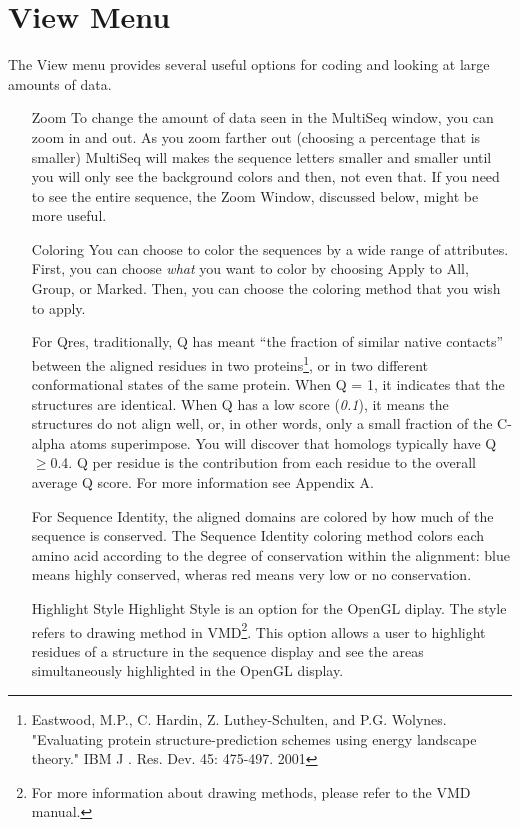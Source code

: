 \label {unit4}


\section{View Menu}

The \textsf{View} menu provides several useful options for coding and
looking at large amounts of data.

\begin{itemize}
\item[Zoom] To change the amount of data seen in the MultiSeq window,
you can zoom in and out.  As you zoom farther out (choosing a percentage
that is smaller) MultiSeq will makes the sequence letters smaller and
smaller until you will only see the background colors and then, not even
that.  If you need to see the entire sequence, the \textsf{Zoom Window},
discussed below, might be more useful.
\item [Coloring]
You can choose to color the sequences by a wide range of attributes.
First, you can choose \emph{what} you want to color by choosing
\textsf{Apply to All}, \textsf{Group}, or \textsf{Marked}.  Then, you
can choose the coloring method that you wish to apply.  

For \textsf{Qres}, traditionally, Q has meant ``the fraction of
     similar native contacts'' between the aligned residues in two
     proteins\footnote {Eastwood, M.P., C. Hardin, Z. Luthey-Schulten,
     and P.G. Wolynes. "Evaluating protein structure-prediction schemes
     using energy landscape theory."  IBM J . Res. Dev. 45: 475-497.
     2001}, or in two different conformational states of the same
     protein.  When Q = 1, it indicates that the structures are
     identical.  When Q has a low score (\textit{0.1}), it means the
     structures do not align well, or, in other words, only a small
     fraction of the C-alpha atoms superimpose.  You will discover that
     homologs typically have Q$\ge$0.4.  Q per residue is the
     contribution from each residue to the overall average Q score.  For
     more information see Appendix A.

For \textsf{Sequence Identity}, the aligned domains are colored by how
much of the sequence is conserved. The \textsf{Sequence Identity}
coloring method colors each amino acid according to the degree of
conservation within the alignment: blue means highly conserved, wheras
red means very low or no conservation.

\item[Highlight Style]
\textsf{Highlight Style} is an option for the OpenGL diplay.  The style
refers to drawing method in VMD\footnote {For more information about
drawing methods, please refer to the VMD manual.}.  This option allows a
user to highlight residues of a structure in the sequence display and
see the areas simultaneously highlighted in the OpenGL display.


\end{itemize}
